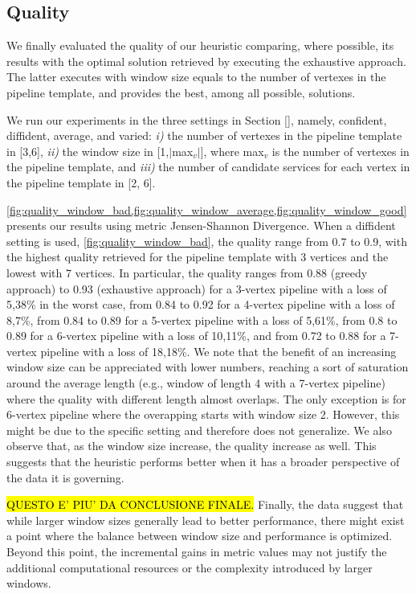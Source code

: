 \subsection{Quality}\label{subsec:experiments_quality}
We finally evaluated the quality of our heuristic comparing, where possible, its results with the optimal solution retrieved by executing the exhaustive approach. The latter executes with window size equals to the number of vertexes in the pipeline template, and provides the best, among all possible, solutions.

We run our experiments in the three settings in Section \ref{}, namely, confident, diffident, average, and varied: \emph{i)} the number of vertexes in the pipeline template in [3,6], \emph{ii)} the window size in [1,$|$max$_v$$|$], where max$_v$ is the number of vertexes in the pipeline template, and \emph{iii)} the number of candidate services for each vertex in the pipeline template in [2, 6].

\cref{fig:quality_window_bad,fig:quality_window_average,fig:quality_window_good} presents our results using metric Jensen-Shannon Divergence.
%
When a diffident setting is used, \cref{fig:quality_window_bad}, the quality range from 0.7 to 0.9, with the highest quality retrieved for the pipeline template with 3 vertices and the lowest with 7 vertices.
In particular, the quality ranges from 0.88 (greedy approach) to 0.93 (exhaustive approach) for a 3-vertex pipeline with a loss of 5,38\% in the worst case, from 0.84 to 0.92 for a 4-vertex pipeline with a loss of 8,7\%, from 0.84 to 0.89 for a 5-vertex pipeline with a loss of 5,61\%, from 0.8 to 0.89 for a 6-vertex pipeline with a loss of 10,11\%, and from 0.72 to 0.88 for a 7-vertex pipeline with a loss of 18,18\%. We note that the benefit of an increasing window size can be appreciated with lower numbers, reaching a sort of saturation around the average length (e.g., window of length 4 with a 7-vertex pipeline) where the quality with different length almost overlaps. The only exception is for 6-vertex pipeline where the overapping starts with window size 2. However, this might be due to the specific setting and therefore does not generalize.
We also observe that, as the window size increase, the quality increase as well. This suggests that the heuristic performs better when it has a broader perspective of the data it is governing.

\hl{QUESTO E' PIU' DA CONCLUSIONE FINALE.} Finally, the data suggest that while larger window sizes generally lead to better performance, there might exist a point where the balance between window size and performance is optimized. Beyond this point, the incremental gains in metric values may not justify the additional computational resources or the complexity introduced by larger windows.


